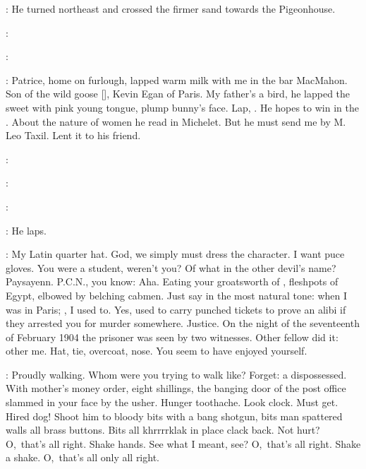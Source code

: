 :
He turned northeast and crossed the firmer sand
towards the Pigeonhouse.

\patrice:

\Stephen:

\StephenInt:
Patrice, home on furlough, lapped warm milk with me in the bar MacMahon.
Son of the wild goose
[],
Kevin Egan of Paris.
My father's a bird,
he lapped the sweet  with pink young tongue,
plump bunny's face.
Lap, .
He hopes to win in the .
About the nature of women he read in Michelet.
But he must send me  by M. Leo Taxil.
Lent it to his friend.

\patrice:

\Stephen:

\patrice:

\StephenInt:
He laps.

\StephenInt:
My Latin quarter hat.
God, we simply must dress the character.
I want puce gloves.
You were a student, weren't you?
Of what in the other devil's name?
Paysayenn.
P.C.N., you know:
Aha.
Eating your groatsworth of ,
fleshpots of Egypt, elbowed by belching cabmen.
Just say in the most natural tone:
when I was in Paris;
, I used to.
Yes, used to carry punched tickets to prove an alibi
if they arrested you for murder somewhere.
Justice.
On the night of the seventeenth of February 1904
the prisoner was seen by two witnesses.
Other fellow did it:
other me.
Hat, tie, overcoat, nose.
You seem to have enjoyed yourself.

\StephenInt:
Proudly walking.
Whom were you trying to walk like?
Forget:
a dispossessed.
With mother's money order, eight shillings,
the banging door of the post office slammed in your face by the usher.
Hunger toothache.
Look clock.
Must get.
Hired dog!
Shoot him to bloody bits with a bang shotgun,
bits man spattered walls all brass buttons.
Bits all khrrrrklak in place clack back.
Not hurt?
O,~that's all right.
Shake hands.
See what I meant, see?
O,~that's all right.
Shake a shake.
O,~that's all only all right.

